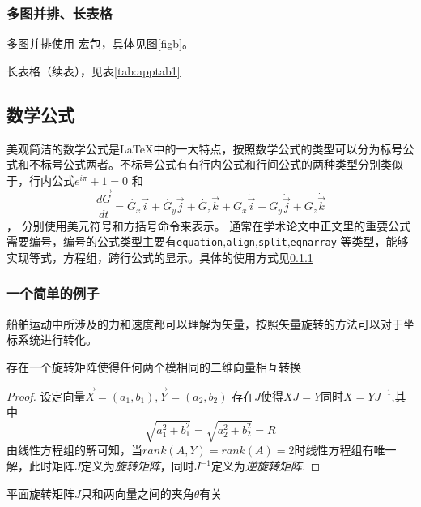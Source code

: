 \subsubsection{多图并排、长表格}

多图并排使用 宏包，具体见图\ref{figb}。

长表格（续表），见表\ref{tab:apptab1}

\subsection{数学公式}

美观简洁的数学公式是\LaTeX 中的一大特点，按照数学公式的类型可以分为标号公式和不标号公式两者。不标号公式有有行内公式和行间公式的两种类型分别类似于，行内公式$ e^{i\pi}+1=0 $ 和\[ \dfrac{d\vec{G}}{dt}=\dot{G_x}\vec{i}+\dot{G_y}\vec{j}+\dot{G_z}\vec{k}+G_x\dot{\vec{i}}+G_y\dot{\vec{j}}+G_z\dot{\vec{k}} \]，
分别使用美元符号和方括号命令来表示。 通常在学术论文中正文里的重要公式需要编号，编号的公式类型主要有\verb|equation|,\verb|align|,\verb|split|,\verb|eqnarray| 等类型，能够实现等式，方程组，跨行公式的显示。具体的使用方式见\ref{example}
\subsubsection{一个简单的例子}\label{example}
船舶运动中所涉及的力和速度都可以理解为矢量，按照矢量旋转的方法可以对于坐标系统进行转化。
\begin{lemma}
	\label{2Drot} 
	存在一个旋转矩阵使得任何两个模相同的二维向量相互转换
\end{lemma}
\begin{proof}
	设定向量$\vec{X}=(a_1,b_1),\vec{Y}=(a_2,b_2)$ 存在$ J $使得$ XJ=Y $同时$X=YJ^{-1}$,其中\[  \sqrt{a_1^{2}+b_1^{2}}=\sqrt{a_2^{2}+b_2^{2}}=R \] 
	由线性方程组的解可知，当$rank(A,Y)=rank(A)=2$时线性方程组有唯一解，此时矩阵$ J $定义为\textit{旋转矩阵}，同时$ J^{-1} $定义为\textit{逆旋转矩阵}.
\end{proof}
\begin{theorem}
	\label{rotM}
	平面旋转矩阵$ J $只和两向量之间的夹角$ \theta $有关
\end{theorem}

